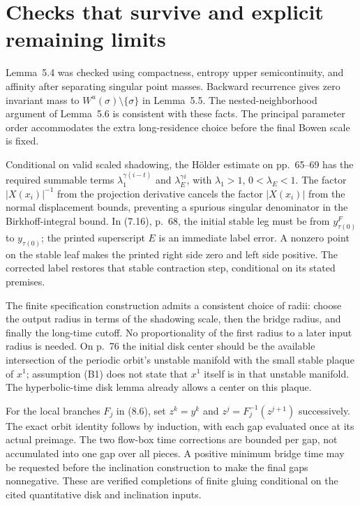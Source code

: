 \documentclass[10pt]{article}
\begin{document}
\section*{Checks that survive and explicit remaining limits}
Lemma 5.4 was checked using compactness, entropy upper semicontinuity, and affinity after separating singular point masses. Backward recurrence gives zero invariant mass to \(W^u(\sigma)\setminus\{\sigma\}\) in Lemma 5.5. The nested-neighborhood argument of Lemma 5.6 is consistent with these facts. The principal parameter order accommodates the extra long-residence choice before the final Bowen scale is fixed.\par
Conditional on valid scaled shadowing, the Hölder estimate on pp. 65–69 has the required summable terms \(\lambda_1^{\gamma(i-t)}\) and \(\lambda_E^{\gamma i}\), with \(\lambda_1>1\), \(0<\lambda_E<1\). The factor \(|X(x_i)|^{-1}\) from the projection derivative cancels the factor \(|X(x_i)|\) from the normal displacement bounds, preventing a spurious singular denominator in the Birkhoff-integral bound. In (7.16), p. 68, the initial stable leg must be from \(y^F_{\tau(0)}\) to \(y_{\tau(0)}\); the printed superscript \(E\) is an immediate label error. A nonzero point on the stable leaf makes the printed right side zero and left side positive. The corrected label restores that stable contraction step, conditional on its stated premises.\par
The finite specification construction admits a consistent choice of radii: choose the output radius in terms of the shadowing scale, then the bridge radius, and finally the long-time cutoff. No proportionality of the first radius to a later input radius is needed. On p. 76 the initial disk center should be the available intersection of the periodic orbit’s unstable manifold with the small stable plaque of \(x^1\); assumption (B1) does not state that \(x^1\) itself is in that unstable manifold. The hyperbolic-time disk lemma already allows a center on this plaque.\par
For the local branches \(F_j\) in (8.6), set \(z^k=y^k\) and \(z^j=F_j^{-1}(z^{j+1})\) successively. The exact orbit identity follows by induction, with each gap evaluated once at its actual preimage. The two flow-box time corrections are bounded per gap, not accumulated into one gap over all pieces. A positive minimum bridge time may be requested before the inclination construction to make the final gaps nonnegative. These are verified completions of finite gluing conditional on the cited quantitative disk and inclination inputs.\par
\end{document}
